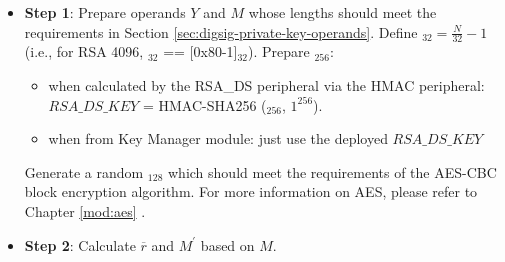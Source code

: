 \documentclass[main\_\_EN.tex]{subfiles}
\begin{document}
\begin{itemize}

    \item {\bfseries Step 1}: Prepare operands \begin{math}Y\end{math} and \begin{math}M\end{math} whose lengths should meet the requirements in Section \ref{sec:digsig-private-key-operands}. Define \begin{math}[L]_{32} = \frac{N}{32}-1 \end{math} (i.e., for RSA 4096, \begin{math}[L]_{32}\end{math} == [0x80-1]\begin{math}_{32}\end{math}). Prepare \begin{math}[RSA\_DS\_KEY]_{256}\end{math}:
    \begin{itemize}
        \item when calculated by the RSA\_DS peripheral via the HMAC peripheral: \begin{math}RSA\_DS\_KEY\end{math} = HMAC-SHA256 (\begin{math}[HMAC\_KEY]_{256}\end{math}, \begin{math}1^{256}\end{math}).
        \item when from Key Manager module: just use the deployed  \begin{math}RSA\_DS\_KEY\end{math}
    \end{itemize}
    Generate a random \begin{math}[IV]_{128}\end{math} which should meet the requirements of the AES-CBC block encryption algorithm. For more information on AES, please refer to Chapter \ref{mod:aes} \textit{}.

    \item {\bfseries Step 2}: Calculate \begin{math}\overline{r}\end{math} and \begin{math}M^{\prime} \end{math} based on \begin{math}M\end{math}.


\end{itemize}
\end{document}
